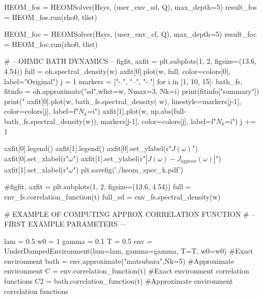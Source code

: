 HEOM_fos = HEOMSolver(Hsys, (user_env_sd, Q),
                      max_depth=5)
result_fos = HEOM_fos.run(rho0, tlist)

HEOM_foc = HEOMSolver(Hsys, (user_env_cf, Q),
                      max_depth=5)
result_foc = HEOM_foc.run(rho0, tlist)

# -- OHMIC BATH DYNAMICS --
figfit, axfit = plt.subplots(1, 2, figsize=(13.6, 4.54))
full = oh.spectral_density(w)
axfit[0].plot(w, full, color=colors[0], label="Original")
j = 1
markers = ["-.", "--", "-."]
for i in [1, 10, 15]:
    bath_fs, fitinfo = oh.approximate("sd",wlist=w, Nmax=3, Nk=i)
    print(fitinfo["summary"])
    print("%
    axfit[0].plot(w, bath_fs.spectral_density(
        w), linestyle=markers[j-1], color=colors[j], label=f"$N_k$={i}")
    axfit[1].plot(w, np.abs(full-bath_fs.spectral_density(w)),
                  markers[j-1], color=colors[j], label=f"$N_k$={i}")
    j += 1

axfit[0].legend()
axfit[1].legend()
axfit[0].set_ylabel(r"$J(\omega)$")
axfit[0].set_xlabel(r"$\omega$")
axfit[1].set_ylabel(r"$|J(\omega)-J_{approx}(\omega)|$")
axfit[1].set_xlabel(r"$\omega$")
plt.savefig('./heom_spec_k.pdf')

#figfit, axfit = plt.subplots(1, 2, figsize=(13.6, 4.54))
full = env_fs.correlation_function(t)
full_sd = env_fs.spectral_density(w)

# EXAMPLE OF COMPUTING APPROX CORRELATION FUNCTION
# -- FIRST EXAMPLE PARAMETERS ---

lam = 0.5
w0 = 1
gamma = 0.1
T = 0.5
env = UnderDampedEnvironment(lam=lam, gamma=gamma, T=T, w0=w0) #Exact environment
bath = env.approximate("matsubara",Nk=5) #Approximate environment
C = env.correlation_function(t) #Exact environment correlation functions
C2 = bath.correlation_function(t) #Approximate environment correlation functions